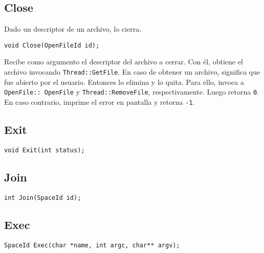 \subsection*{Close}
Dado un descriptor de un archivo, lo cierra.\\
\begin{lstlisting}[style=C]
void Close(OpenFileId id);
\end{lstlisting}
Recibe como argumento el descriptor del archivo a cerrar. Con él, obtiene el archivo invocando \texttt{Thread::GetFile}. En caso de obtener un archivo, significa que fue abierto por el usuario. Entonces lo elimina y lo quita. Para ello, invoca a \texttt{OpenFile::~OpenFile} y \texttt{Thread::RemoveFile}, respectivamente. Luego retorna \texttt{0}.\\
En caso contrario, imprime el error en pantalla y retorna \texttt{-1}.\\
\subsection*{Exit}
\begin{lstlisting}[style=C]
void Exit(int status);
\end{lstlisting}
\subsection*{Join}
\begin{lstlisting}[style=C]
int Join(SpaceId id);
\end{lstlisting}
\subsection*{Exec}
\begin{lstlisting}[style=C]
SpaceId Exec(char *name, int argc, char** argv);
\end{lstlisting}
